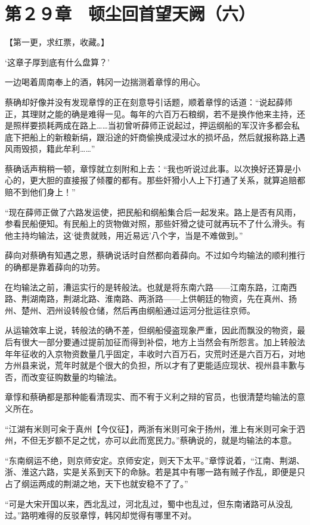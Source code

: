 \section{第２９章　顿尘回首望天阙（六）}

【第一更，求红票，收藏。】

‘这章子厚到底有什么盘算？’

一边喝着周南奉上的酒，韩冈一边揣测着章惇的用心。

蔡确却好像并没有发现章惇的正在刻意导引话题，顺着章惇的话道：“说起薛师正，其理财之能的确是难得一见。每年的六百万石粮纲，若不是换作他来主持，还是照样要损耗两成在路上……当初曾听薛师正说起过，押运纲船的军汉许多都会私底下把船上的新粮新绢，跟沿途的奸商偷换成浸过水的损坏品，然后就报称路上遇风雨毁损，籍此牟利……”

蔡确话声稍稍一顿，章惇就立刻附和上去：“我也听说过此事。以次换好还算是小心的，更大胆的直接报了倾覆的都有。那些奸猾小人上下打通了关系，就算追赔都赔不到他们身上！”

“现在薛师正做了六路发运使，把民船和纲船集合后一起发来。路上是否有风雨，参看民船便知。有民船上的货物做对照，那些奸猾之徒可就再玩不了什么滑头。有他主持均输法，这‘徙贵就贱，用近易远’八个字，当是不难做到。”

薛向对蔡确有知遇之恩，蔡确说话时自然都向着薛向。不过如今均输法的顺利推行的确都是靠着薛向的功劳。

在均输法之前，漕运实行的是转般法。也就是将东南六路——江南东路，江南西路、荆湖南路，荆湖北路、淮南路、两浙路——上供朝廷的物资，先在真州、扬州、楚州、泗州设转般仓储，然后再由纲船通过运河分批运往京师。

从运输效率上说，转般法的确不差，但纲船侵盗现象严重，因此而飘没的物资，最后有很大一部分要通过提前加征而得到补偿，地方上当然会有所怨言。加上转般法年年征收的入京物资数量几乎固定，丰收时六百万石，灾荒时还是六百万石，对地方州县来说，荒年时就是个很大的负担，所以才有了更能适应现状、视州县丰歉与否，而改变征购数量的均输法。

章惇和蔡确都是那种能看清现实、而不宥于义利之辩的官员，也很清楚均输法的意义所在。

“江湖有米则可籴于真州【今仪征】，两浙有米则可籴于扬州，淮上有米则可籴于泗州，不但无岁额不足之忧，亦可以此而宽民力。”蔡确说的，就是均输法的本意。

“东南纲运不绝，则京师安定。京师安定，则天下太平。”章惇说着，“江南、荆湖、浙、淮这六路，实是关系到天下的命脉。若是其中有哪一路有贼子作乱，即便是只占了纲运两成的荆湖之地，天下也就安稳不了了。”

“可是大宋开国以来，西北乱过，河北乱过，蜀中也乱过，但东南诸路可从没乱过。”路明难得的反驳章惇，韩冈却觉得有哪里不对。

